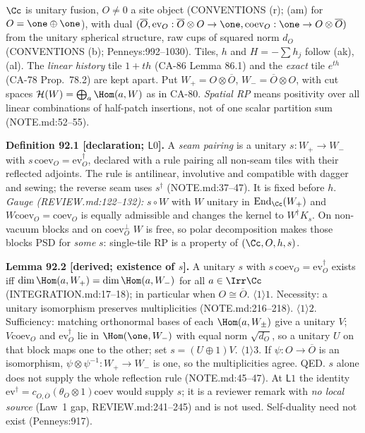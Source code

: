\(\Cc\) is unitary fusion, \(O\neq0\) a site object (CONVENTIONS (r); (am) for \(O=\one\oplus\one\)), with dual
\((\overline O,\mathrm{ev}_O:\overline O\otimes O\to\one,\mathrm{coev}_O:\one\to O\otimes\overline O)\) from the unitary
spherical structure, raw cups of squared norm \(d_O\) (CONVENTIONS (b); Penneys:992--1030).  Tiles, \(h\) and \(H=-\sum
h_j\) follow (ak), (al).  The \emph{linear history} tile \(1+th\) (CA-86 Lemma 86.1) and the \emph{exact} tile
\(e^{th}\) (CA-78 Prop.~78.2) are kept apart.  Put \(W_+=O\otimes\overline O\), \(W_-=\overline O\otimes O\), with cut
spaces \(\mathcal H(W)=\bigoplus_a\Hom(a,W)\) as in CA-80.  \emph{Spatial RP} means positivity over all linear
combinations of half-patch insertions, not of one scalar partition sum (NOTE.md:52--55).

\textbf{Definition 92.1 [declaration; \(\mathsf L0\)].}  A \emph{seam pairing} is a unitary \(s:W_+\to W_-\) with
\(s\,\mathrm{coev}_O=\mathrm{ev}_O^\dagger\), declared with a rule pairing all non-seam tiles with their reflected
adjoints.  The rule is antilinear, involutive and compatible with dagger and sewing; the reverse seam uses \(s^\dagger\)
(NOTE.md:37--47).  It is fixed before \(h\).  \emph{Gauge (REVIEW.md:122--132):} \(s\circ W\) with \(W\) unitary in
\(\operatorname{End}_\Cc(W_+)\) and \(W\mathrm{coev}_O=\mathrm{coev}_O\) is equally admissible and changes the kernel to
\(W^\dagger K_s\).  On non-vacuum blocks and on \(\mathrm{coev}_O^\perp\) \(W\) is free, so polar decomposition makes
those blocks PSD for \emph{some} \(s\): single-tile RP is a property of \((\Cc,O,h,s)\).

\textbf{Lemma 92.2 [derived; existence of \(s\)].}  A unitary \(s\) with \(s\,\mathrm{coev}_O=\mathrm{ev}_O^\dagger\)
exists iff \(\dim\Hom(a,W_+)=\dim\Hom(a,W_-)\) for all \(a\in\Irr\Cc\) (INTEGRATION.md:17--18); in particular when
\(O\cong\overline O\).
\(\langle1\rangle1\). Necessity: a unitary isomorphism preserves multiplicities (NOTE.md:216--218).
\(\langle1\rangle2\). Sufficiency: matching orthonormal bases of each \(\Hom(a,W_\pm)\) give a unitary \(V\); \(V\mathrm{coev}_O\) and
\(\mathrm{ev}_O^\dagger\) lie in \(\Hom(\one,W_-)\) with equal norm \(\sqrt{d_O}\), so a unitary \(U\) on that block maps one to the
other; set \(s=(U\oplus1)V\).  \(\langle1\rangle3\). If \(\psi:O\to\overline O\) is an isomorphism, \(\psi\otimes\psi^{-1}:W_+\to W_-\)
is one, so the multiplicities agree.  QED.
\(s\) alone does not supply the whole reflection rule (NOTE.md:45--47).  At \(\mathsf L1\) the identity
\(\mathrm{ev}^\dagger=c_{O,\overline O}(\theta_O\otimes1)\mathrm{coev}\) would supply \(s\); it is a reviewer remark with
\emph{no local source} (Law~1 gap, REVIEW.md:241--245) and is not used.  Self-duality need not exist (Penneys:917).

